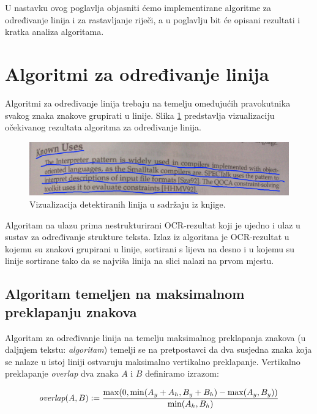 \documentclass[times, utf8, zavrsni]{fer}
\begin{document}
U nastavku ovog poglavlja objasniti ćemo implementirane algoritme za određivanje
linija i za rastavljanje riječi, a u poglavlju bit će opisani rezultati i
kratka analiza algoritama.








\section{Algoritmi za određivanje linija}
\label{sec:algoritmi-za-odredivanje-linija}
Algoritmi za određivanje linija trebaju na temelju omeđujućih pravokutnika
svakog znaka znakove grupirati u linije. Slika \ref{fig:line-semgentation-01}
predstavlja vizualizaciju očekivanog rezultata algoritma za određivanje linija.

\begin{figure}[htb]
    \centering
    \captionsetup{justification=centering,margin=2cm}
    \includegraphics[width=\textwidth]{images/line-segmentation-01.jpg}
    \caption{
        Vizualizacija detektiranih linija u sadržaju iz knjige.
    }
    \label{fig:line-semgentation-01}
\end{figure}

Algoritam na ulazu prima nestrukturirani OCR-rezultat koji je ujedno i ulaz u
sustav za određivanje strukture teksta. Izlaz iz algoritma je OCR-rezultat u
kojemu su znakovi grupirani u linije, sortirani s lijeva na desno i u kojemu
su linije sortirane tako da se najviša linija na slici nalazi na prvom mjestu.




\subsection{Algoritam temeljen na maksimalnom preklapanju znakova}
Algoritam za određivanje linija na temelju maksimalnog preklapanja znakova
(u daljnjem tekstu: \emph{algoritam}) temelji se na pretpostavci da dva susjedna
znaka koja se nalaze u istoj liniji ostvaruju maksimalno vertikalno preklapanje.
Vertikalno preklapanje \textit{overlap} dva znaka $A$ i $B$ definiramo izrazom:

\begin{equation}
\label{eq:overlap}
\textit{overlap}(A, B) \vcentcolon= \frac{\max(0, \min( A_y + A_h, B_y + B_h ) - \max( A_y, B_y ))}
                                {\min(A_h, B_h)}
\end{equation}
\end{document}
